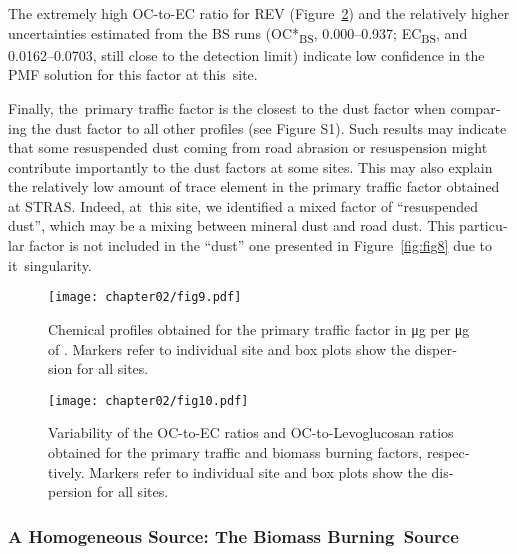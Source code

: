 \begin{otherlanguage}{english}
The extremely high OC-to-EC ratio for REV (Figure~\ref{fig:fig10}) and the relatively
higher uncertainties estimated from the BS runs (OC*\textsubscript{BS},
\SIrange{0.000}{0.937}{\concum}; EC\textsubscript{BS}, and
\SIrange{0.0162}{0.0703}{\concum}, still close to the detection limit) indicate  low
confidence in the PMF solution for this factor at this~site.

Finally, the~primary traffic factor is the closest to the dust factor when comparing the
dust factor to all other profiles (see   Figure S1). Such results may indicate that some
resuspended dust coming from road abrasion or resuspension might contribute importantly to
the dust factors at some sites.  This may also explain the relatively low amount of trace
element in the primary traffic factor obtained at STRAS. Indeed, at~this site, we
identified a mixed factor of ``resuspended dust'',  which  may be a mixing between mineral
dust and road dust. This particular factor is not included in the ``dust'' one presented
in Figure~\ref{fig:fig8} due to it~singularity.

\begin{figure}[h]
    \centering
    \texttt{[image: chapter02/fig9.pdf]}
    \caption{
        Chemical profiles obtained for the primary traffic factor in
        \si{\micro\gram} per \si{\micro\gram} of \PM{}. Markers refer to
        individual site and box plots show the dispersion for all sites.
    }
    \label{fig:fig9}
\end{figure}


\begin{figure}[h]
    \centering
    \texttt{[image: chapter02/fig10.pdf]}
    \caption{
        Variability of the OC-to-EC ratios and OC-to-Levoglucosan ratios obtained
        for the primary traffic and biomass burning factors, respectively.
        Markers refer to individual site and box plots show the dispersion for
        all sites.
    }
    \label{fig:fig10}
\end{figure}

\subsubsection{A Homogeneous Source: The Biomass Burning~Source}%
\label{ssub:a_homogeneous_source_the_biomass_burning_source}


\end{otherlanguage}
